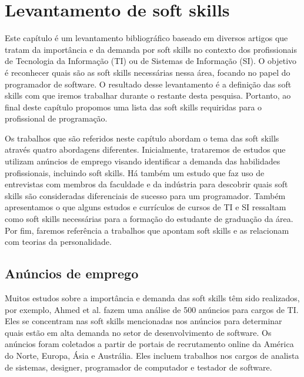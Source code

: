 

\chapter{Levantamento de soft skills}

\label{chap:research}

Este capítulo é um levantamento bibliográfico baseado em diversos artigos que tratam da importância e da demanda por soft skills no contexto dos profissionais de Tecnologia da Informação (TI) ou de Sistemas de Informação (SI). O objetivo é reconhecer quais são as soft skills necessárias nessa área, focando no papel do programador de software. O resultado desse levantamento é a definição das soft skills com que iremos trabalhar durante o restante desta pesquisa. Portanto, ao final deste capítulo propomos uma lista das soft skills requiridas para o profissional de programação.

Os trabalhos que são referidos neste capítulo abordam o tema das soft skills através quatro abordagens diferentes. Inicialmente, trataremos de estudos que utilizam anúncios de emprego visando identificar a demanda das habilidades profissionais, incluindo soft skills. Há também um estudo que faz uso de entrevistas com membros da faculdade e da indústria para descobrir quais soft skills são consideradas diferenciais de sucesso para um programador. Também apresentamos o que alguns estudos e currículos de cursos de TI e SI ressaltam como soft skills necessárias para a formação do estudante de graduação da área. Por fim, faremos referência a trabalhos que apontam soft skills e as relacionam com teorias da personalidade.

\section{Anúncios de emprego}

Muitos estudos sobre a importância e demanda das soft skills têm sido realizados, por exemplo, Ahmed et al. \cite{ahmed:12} fazem uma análise de 500 anúncios para cargos de TI. Eles se concentram nas soft skills mencionadas nos anúncios para determinar quais estão em alta demanda no setor de desenvolvimento de software. Os anúncios foram coletados a partir de portais de recrutamento online da América do Norte, Europa, Ásia e Austrália. Eles incluem trabalhos nos cargos de analista de sistemas, designer, programador de computador e testador de software.

